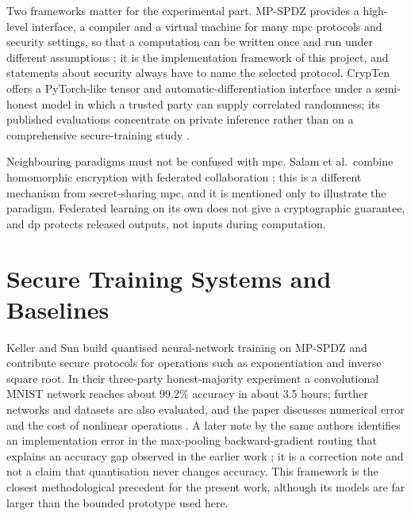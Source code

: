 Two frameworks matter for the experimental part. MP-SPDZ provides a high-level interface, a compiler and a virtual machine for many \ac{mpc} protocols and security settings, so that a computation can be written once and run under different assumptions \cite{keller2020mpspdz}; it is the implementation framework of this project, and statements about security always have to name the selected protocol. CrypTen offers a PyTorch-like tensor and automatic-differentiation interface under a semi-honest model in which a trusted party can supply correlated randomness; its published evaluations concentrate on private inference rather than on a comprehensive secure-training study \cite{knott2021crypten}.

Neighbouring paradigms must not be confused with \ac{mpc}. Salam et al.\ combine homomorphic encryption with federated collaboration \cite{salam2023mpppml}; this is a different mechanism from secret-sharing \ac{mpc}, and it is mentioned only to illustrate the paradigm. Federated learning on its own does not give a cryptographic guarantee, and \ac{dp} protects released outputs, not inputs during computation.

\section{Secure Training Systems and Baselines}\label{sec:lr-systems}
Keller and Sun build quantised neural-network training on MP-SPDZ and contribute secure protocols for operations such as exponentiation and inverse square root. In their three-party honest-majority experiment a convolutional MNIST network reaches about 99.2\% accuracy in about 3.5 hours; further networks and datasets are also evaluated, and the paper discusses numerical error and the cost of nonlinear operations \cite{keller2022sqt}. A later note by the same authors identifies an implementation error in the max-pooling backward-gradient routing that explains an accuracy gap observed in the earlier work \cite{keller2023note}; it is a correction note and not a claim that quantisation never changes accuracy. This framework is the closest methodological precedent for the present work, although its models are far larger than the bounded prototype used here.

